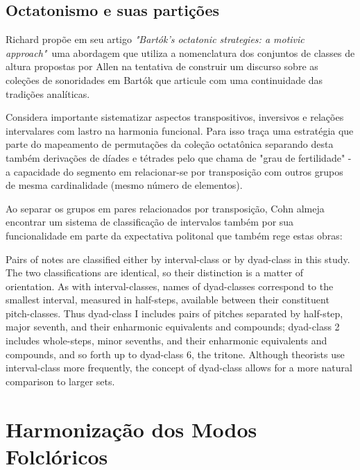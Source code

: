 \documentclass[
	12pt,				%
	openright,			%
	twoside,			%
	a4paper,			%
	english,			%
	french,				%
	spanish,			%
	brazil				%
	]{abntex2}
\begin{document}
\subsection{Octatonismo e suas partições}

Richard  propõe em seu artigo \textit{"Bartók's octatonic strategies: a motivic approach"}\ uma abordagem que utiliza a nomenclatura dos conjuntos de classes de altura propostas por Allen  na tentativa de construir um discurso sobre as coleções de sonoridades em Bartók que articule com uma continuidade das tradições analíticas.

Considera importante sistematizar aspectos transpositivos, inversivos e relações intervalares com lastro na harmonia funcional. Para isso traça uma estratégia que parte do mapeamento de permutações da coleção octatônica separando desta também derivações de díades e tétrades pelo que chama de "grau de fertilidade"\cite[ p.268]{cohn1991bartok} - a capacidade do segmento em relacionar-se por transposição com outros grupos de mesma cardinalidade (mesmo número de elementos).

Ao separar os grupos em pares relacionados por transposição, Cohn almeja encontrar um sistema de classificação de intervalos também por sua funcionalidade em parte da expectativa politonal que também rege estas obras:

\begin{citacao}
Pairs of notes are classified either by interval-class or by dyad-class in this study.
The two classifications are identical, so their distinction is a matter of orientation. As
with interval-classes, names of dyad-classes correspond to the smallest interval, measured in half-steps, available between their constituent pitch-classes. Thus dyad-class I includes pairs of pitches separated by half-step, major seventh, and their enharmonic equivalents and compounds; dyad-class 2 includes whole-steps, minor sevenths, and their enharmonic equivalents and compounds, and so forth up to
dyad-class 6, the tritone. Although theorists use interval-class more frequently, the
concept of dyad-class allows for a more natural comparison to larger sets.
\cite[ p.265-266]{cohn1991bartok}
\end{citacao}





\section{Harmonização dos Modos Folclóricos}
\end{document}
